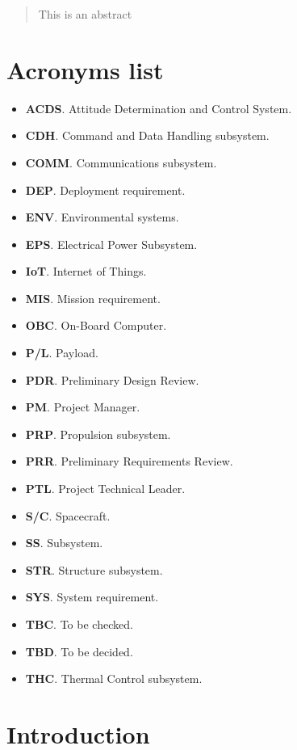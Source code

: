 \begin{abstract}
This is an abstract
\end{abstract}

\section*{Acronyms list}

\begin{itemize}
	\item \textbf{ACDS}. Attitude Determination and Control System.
	\item \textbf{CDH}. Command and Data Handling subsystem.
	\item \textbf{COMM}. Communications subsystem.
	\item \textbf{DEP}. Deployment requirement.
	\item \textbf{ENV}. Environmental systems.
	\item \textbf{EPS}. Electrical Power Subsystem.
	\item \textbf{IoT}. Internet of Things.
	\item \textbf{MIS}. Mission requirement.
	\item \textbf{OBC}. On-Board Computer.
	\item \textbf{P/L}. Payload.
	\item \textbf{PDR}. Preliminary Design Review.
	\item \textbf{PM}. Project Manager.
	\item \textbf{PRP}. Propulsion subsystem.
	\item \textbf{PRR}. Preliminary Requirements Review.
	\item \textbf{PTL}. Project Technical Leader.
	\item \textbf{S/C}. Spacecraft.
	\item \textbf{SS}. Subsystem.
	\item \textbf{STR}. Structure subsystem.
	\item \textbf{SYS}. System requirement.
	\item \textbf{TBC}. To be checked.
	\item \textbf{TBD}. To be decided.
	\item \textbf{THC}. Thermal Control subsystem.
\end{itemize}

\section{Introduction}

